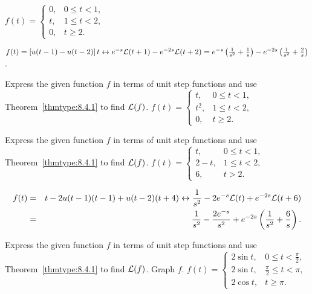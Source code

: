 \documentclass{ximera}
\begin{document}
\begin{problem}\label{exer:8.4.12} $f(t)=\left\{\begin{array}{cl} 0,&0 \le
t<1,\\ t,&1\le t<2,\\ 0,&t\ge2.\end{array}\right.$

\begin{solution}
$f(t)=\left[u(t-1)-u(t-2)\right]t\leftrightarrow
e^{-s}{\cal L}(t+1)-e^{-2s}{\cal L}(t+2)\\=
e^{-s}\left(\frac{1}{s^2}+\frac{1}{s}\right)-e^{-2s}\left(\frac{1}{s^2}
+\frac{2}{s}\right)$.
\end{solution}
\end{problem}

\begin{problem}\label{exer:8.4.13} 
 Express the
given function $f$ in terms of unit step functions
 and use Theorem~\ref{thmtype:8.4.1} to find ${\cal L}(f)$.
 $f(t)=\left\{\begin{array}{cl} t,&0 \le
t<1,\\ t^2,&1\le t<2,\\ 0,&t\ge2. \end{array}\right.$
\end{problem}

 \begin{problem}\label{exer:8.4.14} 
 Express the
given function $f$ in terms of unit step functions
 and use Theorem~\ref{thmtype:8.4.1} to find ${\cal L}(f)$.
 $f(t)=\left\{\begin{array}{cl} t,&0\le
t<1,\\ 2-t,&1\le t<2,\\ 6,&t > 2. \end{array}\right.$

\begin{solution}
\begin{eqnarray*}
f(t)&=&t-2u(t-1)(t-1)+u(t-2)(t+4)\leftrightarrow
   \frac{1}{s^2}-2e^{-s}{\cal L}(t)+e^{-2s}{\cal L}(t+6)\\
  &=&\frac{1}{s^2}-\frac{2e^{-s}}{s^2}
+e^{-2s}\left(\frac{1}{s^2}+\frac{6}{s}\right).
\end{eqnarray*}
\end{solution}
\end{problem}

\begin{problem}\label{exer:8.4.15} 
Express the given function $f$ in terms of unit step functions and use Theorem~\ref{thmtype:8.4.1} to find ${\cal L}(f)$.  Graph $f$.
 $f(t)=\left\{\begin{array}{cl}
2
\sin t,&0\le t<\frac{\pi}{2},\\ 2\sin t,&
\frac{\pi}{2}\le t<\pi,\\ 2\cos t,
&t\ge\pi.\end{array}\right.$
\end{problem}
\end{document}
